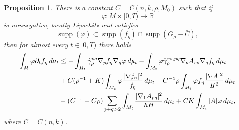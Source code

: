 \documentclass[12pt]{amsart}
\newtheorem{proposition}[theorem]{Proposition}
\DeclareMathOperator{\supp}{supp}
\begin{document}
\begin{proposition}
There is a constant $\bar C = \bar C(n,k,\rho,M_0)$ such that if 
\[\varphi : M \times[0,T) \to \mathbb{R}\]
is nonnegative, locally Lipschitz and satisfies
\[\supp(\varphi) \subset \supp(f_\eta) \cap \supp(G_\rho - \bar C),\]
then for almost every $t \in [0,T)$ there holds 
\begin{align}
\label{eq:f_stamp_int}
\int_M \varphi \partial_t f_\eta \, d\mu_t &\leq - \int_{M_t} \dot \gamma_\rho^{pq} \nabla_p f_\eta \nabla_q \varphi\,d\mu_t - \int_{M_t} \varphi \ddot \gamma^{rs,pq}_\rho \nabla_p A_{rs} \nabla_q f_\eta \, d\mu_t \notag \\
& + C(\rho^{-1} + K) \int_{M_t} \varphi \frac{|\nabla f_\eta|^2}{f_\eta} \,d\mu_t - C^{-1} \rho \int_{M_t} \varphi f_\eta \frac{|\nabla A|^2}{H^2} \,d\mu_t \notag \\
& - (C^{-1} - C\rho) \sum_{p+q>2} \int_{M_t}\frac{|\nabla_1 A_{pq}|^2}{hH} \,d\mu_t + CK\int_{M_t} |A|\varphi \,d\mu_t,
\end{align}
where $C = C(n,k)$. 
\end{proposition}
\end{document}
